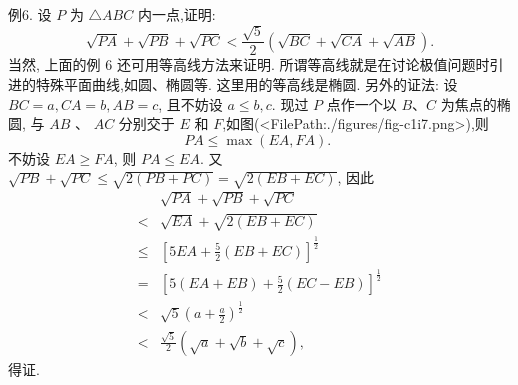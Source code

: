 例6. 设 $P$ 为 $\triangle A B C$ 内一点,证明:
$$
\sqrt{P A}+\sqrt{P B}+\sqrt{P C}<\frac{\sqrt{5}}{2}(\sqrt{B C}+\sqrt{C A}+\sqrt{A B}) . \label{eq1}
$$
当然, 上面的例 6 还可用等高线方法来证明.
所谓等高线就是在讨论极值问题时引进的特殊平面曲线,如圆、椭圆等.
这里用的等高线是椭圆.
另外的证法:
设 $B C=a, C A=b, A B=c$, 且不妨设 $a \leqslant b, c$.
现过 $P$ 点作一个以 $B 、 C$ 为焦点的椭圆, 与 $A B$ 、 $A C$ 分别交于 $E$ 和 $F$,如图(<FilePath:./figures/fig-c1i7.png>),则
$$
P A \leqslant \max (E A, F A) \text {. }
$$
不妨设 $E A \geqslant F A$, 则 $P A \leqslant E A$.
又
$\sqrt{P B}+\sqrt{P C} \leqslant \sqrt{2(P B+P C)}=\sqrt{2(E B+E C)}$,
因此
$$
\begin{aligned}
& \sqrt{P A}+\sqrt{P B}+\sqrt{P C} \\
< & \sqrt{E A}+\sqrt{2(E B+E C)} \\
\leqslant & {\left[5 E A+\frac{5}{2}(E B+E C)\right]^{\frac{1}{2}} } \\
= & {\left[5(E A+E B)+\frac{5}{2}(E C-E B)\right]^{\frac{1}{2}} } \\
< & \sqrt{5}\left(a+\frac{a}{2}\right)^{\frac{1}{2}} \\
< & \frac{\sqrt{5}}{2}(\sqrt{a}+\sqrt{b}+\sqrt{c}),
\end{aligned}
$$
得证.


